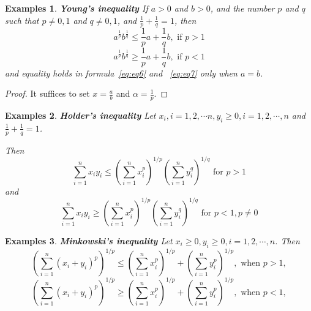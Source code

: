 \documentclass[a4paper,12pt]{article} %
\newtheorem{example}{Examples}
\begin{document}
\begin{example}{\rm \textbf{Young's inequality}}
    \normalfont
    If $a > 0$ and $b > 0$, and the number $p$ and $q$ such that $p \ne 0,1$ and 
    $q \ne 0,1$, and $\displaystyle \frac{1}{p} + \frac{1}{q} = 1$, then 
    \begin{equation}
        a^{\frac{1}{p}}b^{\frac{1}{q}} \le \frac{1}{p}a + \frac{1}{q}b, \text{ if } p > 1
        \label{eq:eq6}
    \end{equation}
    \begin{equation}
        a^{\frac{1}{p}}b^{\frac{1}{q}} \ge \frac{1}{p}a + \frac{1}{q}b, \text{ if } p < 1
        \label{eq:eq7}
    \end{equation}
    and equality holds in formula~\ref{eq:eq6} and ~\ref{eq:eq7} only when $a = b$.
\end{example}
\begin{proof}
    It suffices to set $x = \frac{a}{b}$ and $\alpha = \frac{1}{p}$.
\end{proof}

\begin{example}{\rm \textbf{Holder's inequality}}
    \normalfont
    Let $x_i,i=1,2,\cdots n, y_i \ge 0, i=1,2,\cdots,n$ and $\frac{1}{p} + \frac{1}{q} = 1$.
    
    Then 
    \begin{equation}
        \sum_{i=1}^{n}x_iy_i \le \left(\sum_{i=1}^{n}x_i^p\right)^{1/p}
        \left(\sum_{i=1}^ny_i^q\right)^{1/q} \text{ for } p > 1 
    \end{equation}
    and 
    \begin{equation}
        \sum_{i=1}^{n}x_iy_i \ge \left(\sum_{i=1}^{n}x_i^p\right)^{1/p}
        \left(\sum_{i=1}^ny_i^q\right)^{1/q} \text{ for } p < 1, p \ne 0 
    \end{equation}
\end{example}

\begin{example}{\rm \textbf{Minkowski's inequality}}
    \normalfont
    Let $x_i\ge 0, y_i \ge 0, i=1,2,\cdots,n$. Then 
    \begin{equation}
        \left(\sum_{i=1}^n\left(x_i+y_i\right)^p\right)^{1/p} \le \left(\sum_{i=1}^nx_i^p\right)^{1/p}+ \left(\sum_{i=1}^ny_i^p\right)^{1/p} , \text{ when } p > 1,
    \end{equation}
    \begin{equation}
        \left(\sum_{i=1}^n\left(x_i+y_i\right)^p\right)^{1/p} \ge \left(\sum_{i=1}^nx_i^p\right)^{1/p}+ \left(\sum_{i=1}^ny_i^p\right)^{1/p} , \text{ when } p < 1,
    \end{equation}
\end{example}
\end{document}
